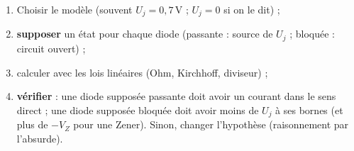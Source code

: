 \begin{exbox}[title={Méthode générale pour un circuit à diodes (synthèse du chapitre)}]
\begin{enumerate}
  \item Choisir le modèle (souvent $U_j = 0{,}7$\,V ; $U_j = 0$ si on le dit) ;
  \item \textbf{supposer} un état pour chaque diode (passante : source de $U_j$ ; bloquée :
        circuit ouvert) ;
  \item calculer avec les lois linéaires (Ohm, Kirchhoff, diviseur) ;
  \item \textbf{vérifier} : une diode supposée passante doit avoir un courant dans le sens
        direct ; une diode supposée bloquée doit avoir moins de $U_j$ à ses bornes (et plus
        de $-V_Z$ pour une Zener). Sinon, changer l'hypothèse (raisonnement par l'absurde).
\end{enumerate}
\end{exbox}

